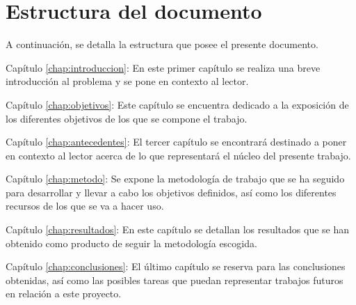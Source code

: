 \clearpage

\section{Estructura del documento}

A continuación, se detalla la estructura que posee el presente documento.

\begin{definitionlist}
    \item[Capítulo \ref{chap:introduccion}: \nameref{chap:introduccion}] En este primer capítulo se realiza una breve introducción al problema y se pone en contexto al lector.
    \item[Capítulo \ref{chap:objetivos}: \nameref{chap:objetivos}] Este capítulo se encuentra dedicado a la exposición de los diferentes objetivos de los que se compone el trabajo.
    \item[Capítulo \ref{chap:antecedentes}: \nameref{chap:antecedentes}] El tercer capítulo se encontrará destinado a poner en contexto al lector acerca de lo que representará el núcleo del presente trabajo.
    \item[Capítulo \ref{chap:metodo}: \nameref{chap:metodo}] Se expone la metodología de trabajo que se ha seguido para desarrollar y llevar a cabo los objetivos definidos, así como los diferentes recursos de los que se va a hacer uso.
    \item[Capítulo \ref{chap:resultados}: \nameref{chap:resultados}] En este capítulo se detallan los resultados que se han obtenido como producto de seguir la metodología escogida.
    \item[Capítulo \ref{chap:conclusiones}: \nameref{chap:conclusiones}] El último capítulo se reserva para las conclusiones obtenidas, así como las posibles tareas que puedan representar trabajos futuros en relación a este proyecto.
\end{definitionlist}


